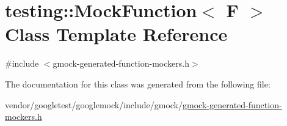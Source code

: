 \hypertarget{classtesting_1_1_mock_function}{}\section{testing\+:\+:Mock\+Function$<$ F $>$ Class Template Reference}
\label{classtesting_1_1_mock_function}


{\ttfamily \#include $<$gmock-\/generated-\/function-\/mockers.\+h$>$}



The documentation for this class was generated from the following file\+:\begin{DoxyCompactItemize}
\item 
vendor/googletest/googlemock/include/gmock/\hyperlink{gmock-generated-function-mockers_8h}{gmock-\/generated-\/function-\/mockers.\+h}\end{DoxyCompactItemize}
